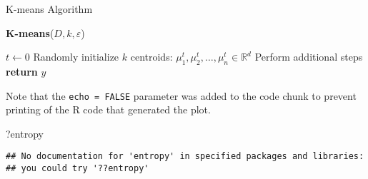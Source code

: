 \documentclass[
]{article}
\newenvironment{Shaded}{\begin{snugshade}}{\end{snugshade}}
\newcommand{\NormalTok}[1]{#1}
\begin{document}
\begin{algorithm}
\LinesNumbered %
\caption{K-means Algorithm}

\textbf{K-means}($D, k, \varepsilon$) {
  
  $t \leftarrow 0$\;
  Randomly initialize $k$ centroids: $\mu_{1}^{t}, \mu_{2}^{t}, \ldots, \mu_{n}^{t} \in \mathbb{R}^d$\;
  Perform additional steps\;
  \textbf{return} $y$\;
}
\end{algorithm}

Note that the \texttt{echo\ =\ FALSE} parameter was added to the code
chunk to prevent printing of the R code that generated the plot.

\begin{Shaded}
\begin{Highlighting}[]
\NormalTok{?entropy}
\end{Highlighting}
\end{Shaded}

\begin{verbatim}
## No documentation for 'entropy' in specified packages and libraries:
## you could try '??entropy'
\end{verbatim}
\end{document}
